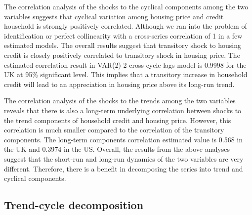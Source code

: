 \documentclass[
  12pt,
]{article}
\begin{document}
        The correlation analysis of the shocks to the cyclical components among the two variables suggests that cyclical variation among housing price and credit household is strongly positively correlated. Although we ran into the problem of identification or perfect collinearity with a cross-series correlation of 1 in a few estimated models. The overall results suggest that transitory shock to housing credit is closely positively correlated to transitory shock in housing price. The estimated correlation result in VAR(2) 2-cross cycle lags model is 0.9998 for the UK at 95\% significant level. This implies that a transitory increase in household credit will lead to an appreciation in housing price above its long-run trend.
        
        The correlation analysis of the shocks to the trends among the two variables reveals that there is also a long-term underlying correlation between shocks to the trend components of household credit and housing price. However, this correlation is much smaller compared to the correlation of the transitory components. The long-term components correlation estimated value is 0.568 in the UK and 0.3974 in the US. Overall, the results from the above analyses suggest that the short-run and long-run dynamics of the two variables are very different. Therefore, there is a benefit in decomposing the series into trend and cyclical components.
        
        
        \subsection{Trend-cycle decomposition}
        
        
%       
%       
\end{document}
